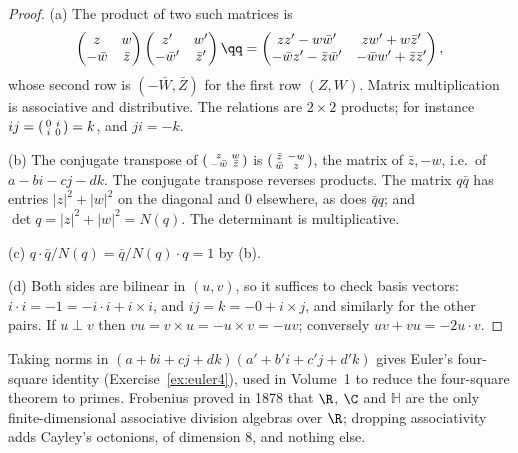 \begin{proof}
(a) The product of two such matrices is
\[
\begin{gathered}\begin{pmatrix}z&w\\-\bar w&\bar z\end{pmatrix}\begin{pmatrix}z'&w'\\-\bar w'&\bar z'\end{pmatrix}\qq=\begin{pmatrix}zz'-w\bar w'&zw'+w\bar z'\\-\bar wz'-\bar z\bar w'&-\bar ww'+\bar z\bar z'\end{pmatrix},\end{gathered}
\]
whose second row is $(-\bar W,\bar Z)$ for the first row $(Z,W)$. Matrix multiplication is associative and distributive. The relations are $2\times2$ products; for instance $ij=\begin{psmallmatrix}0&i\\i&0\end{psmallmatrix}=k$, and $ji=-k$.

(b) The conjugate transpose of $\begin{psmallmatrix}z&w\\-\bar w&\bar z\end{psmallmatrix}$ is $\begin{psmallmatrix}\bar z&-w\\\bar w&z\end{psmallmatrix}$, the matrix of $\bar z,-w$, i.e.\ of $a-bi-cj-dk$. The conjugate transpose reverses products. The matrix $q\bar q$ has entries $|z|^2+|w|^2$ on the diagonal and $0$ elsewhere, as does $\bar qq$; and $\det q=|z|^2+|w|^2=N(q)$. The determinant is multiplicative.

(c) $q\cdot\bar q/N(q)=\bar q/N(q)\cdot q=1$ by (b).

(d) Both sides are bilinear in $(u,v)$, so it suffices to check basis vectors: $i\cdot i=-1=-i\cdot i+i\times i$, and $ij=k=-0+i\times j$, and similarly for the other pairs. If $u\perp v$ then $vu=v\times u=-u\times v=-uv$; conversely $uv+vu=-2u\cdot v$.
\end{proof}

Taking norms in $(a+bi+cj+dk)(a'+b'i+c'j+d'k)$ gives Euler's four-square identity (Exercise~\ref{ex:euler4}), used in Volume~1 to reduce the four-square theorem to primes. Frobenius proved in 1878 that $\R$, $\C$ and $\mathbb H$ are the only finite-dimensional associative division algebras over $\R$; dropping associativity adds Cayley's octonions, of dimension $8$, and nothing else.

